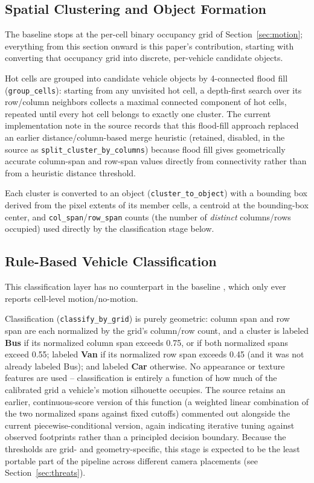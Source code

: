 \documentclass[conference]{IEEEtran}
\newcommand{\code}[1]{\texttt{#1}}
\begin{document}
\subsection{Spatial Clustering and Object Formation}
\label{sec:cluster}

The baseline \cite{baseline} stops at the per-cell binary occupancy grid
of Section~\ref{sec:motion}; everything from this section onward is
this paper's contribution, starting with converting that occupancy grid
into discrete, per-vehicle candidate objects.

Hot cells are grouped into candidate vehicle objects by 4-connected
flood fill (\code{group\_cells}): starting from any unvisited hot cell,
a depth-first search over its row/column neighbors collects a maximal
connected component of hot cells, repeated until every hot cell belongs
to exactly one cluster. The current implementation note in the source
records that this flood-fill approach replaced an earlier
distance/column-based merge heuristic (retained, disabled, in the
source as \code{split\_cluster\_by\_columns}) because flood fill gives
geometrically accurate column-span and row-span values directly from
connectivity rather than from a heuristic distance threshold.

Each cluster is converted to an object (\code{cluster\_to\_object}) with
a bounding box derived from the pixel extents of its member cells, a
centroid at the bounding-box center, and \code{col\_span}/\code{row\_span}
counts (the number of \emph{distinct} columns/rows occupied) used
directly by the classification stage below.

\subsection{Rule-Based Vehicle Classification}
\label{sec:classify}

This classification layer has no counterpart in the baseline
\cite{baseline}, which only ever reports cell-level motion/no-motion.

Classification (\code{classify\_by\_grid}) is purely geometric: column
span and row span are each normalized by the grid's column/row count,
and a cluster is labeled \textbf{Bus} if its normalized column span
exceeds 0.75, or if both normalized spans exceed 0.55; labeled
\textbf{Van} if its normalized row span exceeds 0.45 (and it was not
already labeled Bus); and labeled \textbf{Car} otherwise. No appearance
or texture features are used -- classification is entirely a function
of how much of the calibrated grid a vehicle's motion silhouette
occupies. The source retains an earlier, continuous-score version of
this function (a weighted linear combination of the two normalized
spans against fixed cutoffs) commented out alongside the current
piecewise-conditional version, again indicating iterative tuning
against observed footprints rather than a principled decision boundary.
Because the thresholds are grid- and geometry-specific, this stage is
expected to be the least portable part of the pipeline across different
camera placements (see Section~\ref{sec:threats}).
\end{document}
